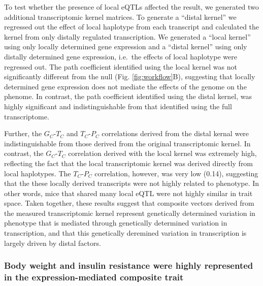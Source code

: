 \documentclass[
]{article}
\begin{document}
To test whether the presence of local eQTLs affected the result, we
generated two additional transcriptomic kernel matrices. To generate a
``distal kernel'' we regressed out the effect of local haplotype from
each transcript and calculated the kernel from only distally regulated
transcription. We generated a ``local kernel'' using only locally
determined gene expression and a ``distal kernel'' using only distally
determined gene expression, i.e.~the effects of local haplotype were
regressed out. The path coefficient identified using the local kernel
was not significantly different from the null (Fig.
\ref{fig:workflow}B), suggesting that locally determined gene expression
does not mediate the effects of the genome on the phenome. In contrast,
the path coefficient identified using the distal kernel, was highly
significant and indistinguishable from that identified using the full
transcriptome.

Further, the \(G_C\)-\(T_C\) and \(T_C\)-\(P_C\) correlations derived
from the distal kernal were indistinguishable from those derived from
the original transcriptomic kernel. In contrast, the \(G_C\)-\(T_C\)
correlation derived with the local kernel was extremely high, reflecting
the fact that the local transcriptomic kernel was derived directly from
local haplotypes. The \(T_C\)-\(P_C\) correlation, however, was very low
(0.14), suggesting that the these locally derived transcripts were not
highly related to phenotype. In other words, mice that shared many local
eQTL were not highly similar in trait space. Taken together, these
results suggest that composite vectors derived from the measured
transcriptomic kernel represent genetically determined variation in
phenotype that is mediated through genetically determined variation in
transcription, and that this genetically deremined variation in
transcription is largely driven by distal factors.

\subsubsection{Body weight and insulin resistance were highly
represented in the expression-mediated composite
trait}\label{body-weight-and-insulin-resistance-were-highly-represented-in-the-expression-mediated-composite-trait}
\end{document}
